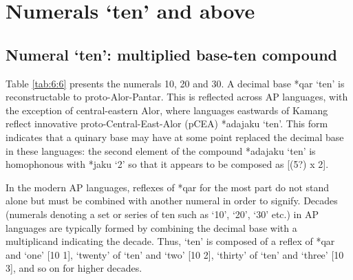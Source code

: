 \section{Numerals `ten' and above}\label{sec:6:6}
\subsection{Numeral `ten': multiplied base-ten compound} \label{sec:6:6.1}
Table \ref{tab:6:6} presents the numerals 10, 20 and 30. A decimal base *qar `ten' is reconstructable to proto-Alor-Pantar. This is reflected across AP languages, with the exception of central-eastern Alor, where languages eastwards of Kamang reflect innovative proto-Central-East-Alor (pCEA) *adajaku `ten'. This form indicates that a quinary base may have at some point replaced the decimal base in these languages: the second element of the compound *adajaku `ten' is homophonous with *jaku `2' so that it appears to be composed as [(5?) x 2]. 

In the modern AP languages, reflexes of *qar for the most part do not stand alone but must be combined with another numeral in order to signify. Decades (numerals denoting a set or series of ten such as `10', `20', `30' etc.) in AP languages are typically formed by combining the decimal base with a multiplicand indicating the decade. Thus, `ten' is composed of a reflex of *qar and `one' [10 1], `twenty' of `ten' and `two' [10 2], `thirty' of `ten' and `three' [10 3], and so on for higher decades. 




